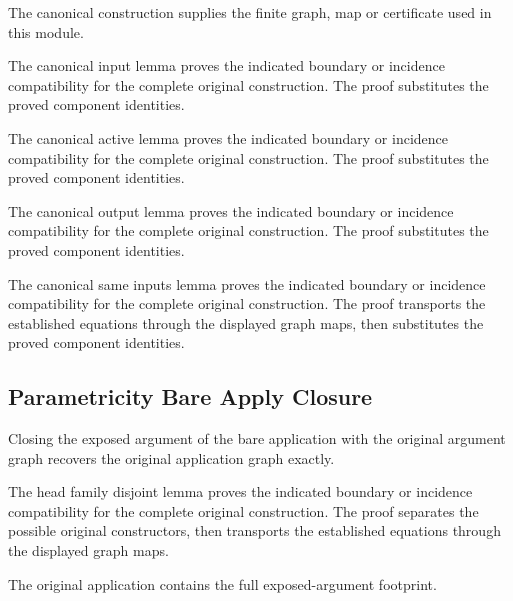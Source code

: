 The canonical construction supplies the finite graph, map or certificate used in this module.
\par{}

The canonical input lemma proves the indicated boundary or incidence compatibility for the complete original construction.
The proof substitutes the proved component identities.
\par{}

The canonical active lemma proves the indicated boundary or incidence compatibility for the complete original construction.
The proof substitutes the proved component identities.
\par{}

The canonical output lemma proves the indicated boundary or incidence compatibility for the complete original construction.
The proof substitutes the proved component identities.
\par{}

The canonical same inputs lemma proves the indicated boundary or incidence compatibility for the complete original construction.
The proof transports the established equations through the displayed graph maps, then substitutes the proved component identities.
\par{}

\subsection{Parametricity Bare Apply Closure}
Closing the exposed argument of the bare application with the original
argument graph recovers the original application graph exactly.

The head family disjoint lemma proves the indicated boundary or incidence compatibility for the complete original construction.
The proof separates the possible original constructors, then transports the established equations through the displayed graph maps.
\par{}

The original application contains the full exposed-argument footprint.
\par{}


